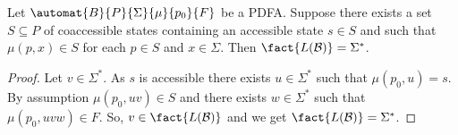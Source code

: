 \begin{proposition}\label{constrsync:prop:upperset}
	Let $\automat{B}{P}{\Sigma}{\mu}{p_0}{F}$ be a PDFA.
	Suppose there exists a set $S \subseteq P$ of coaccessible states
	containing an accessible state $s \in S$
	and	such that $\mu(p, x) \in S$ for each $p \in S$ and $x \in \Sigma$.
    Then $\fact{L(\mathcal B)} = \Sigma^*$.
\end{proposition} 
\begin{proof}
	Let $v \in \Sigma^*$. 
    As $s$ is accessible there exists $u \in \Sigma^*$
	such that $\mu(p_0, u) = s$.
	By assumption $\mu(p_0, uv) \in S$
	and there exists $w \in \Sigma^*$ such that $\mu(p_0, uvw) \in F$.
	So, $v \in \fact{L(\mathcal B)}$
	and we get $\fact{L(\mathcal B)} = \Sigma^*$.	
\end{proof} 

